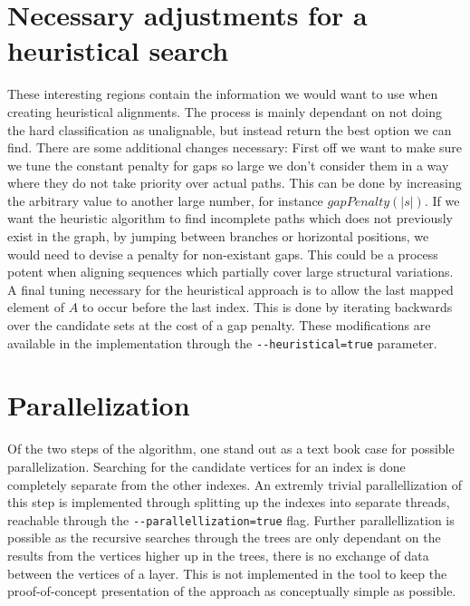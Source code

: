 \documentclass[thesis.tex]{subfiles}
\begin{document}
\section{Necessary adjustments for a heuristical search}
\label{sec:implementation_heuristic}
These interesting regions contain the information we would want to use when creating heuristical alignments. The process is mainly dependant on not doing the hard classification as unalignable, but instead return the best option we can find. There are some additional changes necessary: First off we want to make sure we tune the constant penalty for gaps so large we don't consider them in a way where they do not take priority over actual paths. This can be done by increasing the arbitrary value to another large number, for instance $gapPenalty(|s|)$. If we want the heuristic algorithm to find incomplete paths which does not previously exist in the graph, by jumping between branches or horizontal positions, we would need to devise a penalty for non-existant gaps. This could be a process potent when aligning sequences which partially cover large structural variations. A final tuning necessary for the heuristical approach is to allow the last mapped element of $A$ to occur before the last index. This is done by iterating backwards over the candidate sets at the cost of a gap penalty. These modifications are available in the implementation through the \texttt{-{}-heuristical=true} parameter.
\section{Parallelization}
Of the two steps of the algorithm, one stand out as a text book case for possible parallelization. Searching for the candidate vertices for an index is done completely separate from the other indexes. An extremly trivial parallellization of this step is implemented through splitting up the indexes into separate threads, reachable through the \texttt{-{}-parallellization=true} flag. Further parallellization is possible as the recursive searches through the trees are only dependant on the results from the vertices higher up in the trees, there is no exchange of data between the vertices of a layer. This is not implemented in the tool to keep the proof-of-concept presentation of the approach as conceptually simple as possible.
\clearpage
\end{document}
